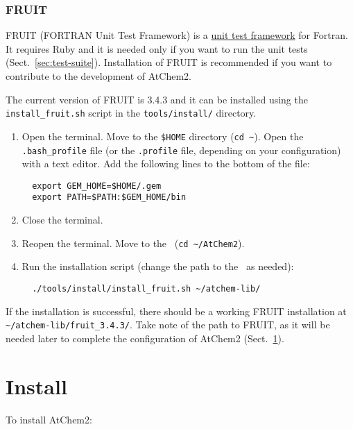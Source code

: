 \subsubsection{FRUIT}

FRUIT (FORTRAN Unit Test Framework) is a
\href{https://en.wikipedia.org/wiki/Unit_testing}{unit test framework}
for Fortran. It requires Ruby and it is needed only if you want to run
the unit tests (Sect.~\ref{sec:test-suite}). Installation of FRUIT is
recommended if you want to contribute to the development of AtChem2.

The current version of FRUIT is 3.4.3 and it can be installed using
the \texttt{install\_fruit.sh} script in the \texttt{tools/install/}
directory.

\begin{enumerate}
\item Open the terminal. Move to the \texttt{\$HOME} directory
  (\texttt{cd\ \textasciitilde}). Open the \texttt{.bash\_profile}
  file (or the \texttt{.profile} file, depending on your
  configuration) with a text editor. Add the following lines to the
  bottom of the file:
  \begin{verbatim}
  export GEM_HOME=$HOME/.gem
  export PATH=$PATH:$GEM_HOME/bin
  \end{verbatim}
\item Close the terminal.
\item Reopen the terminal. Move to the \maindir\ (\verb|cd ~/AtChem2|).
\item Run the installation script (change the path to the \depdir\ as
  needed):
  \begin{verbatim}
  ./tools/install/install_fruit.sh ~/atchem-lib/
  \end{verbatim}
\end{enumerate}

If the installation is successful, there should be a working FRUIT
installation at \texttt{\textasciitilde/atchem-lib/fruit\_3.4.3/}.
Take note of the path to FRUIT, as it will be needed later to complete
the configuration of AtChem2 (Sect.~\ref{sec:install}).


\section{Install} \label{sec:install}

To install AtChem2:

